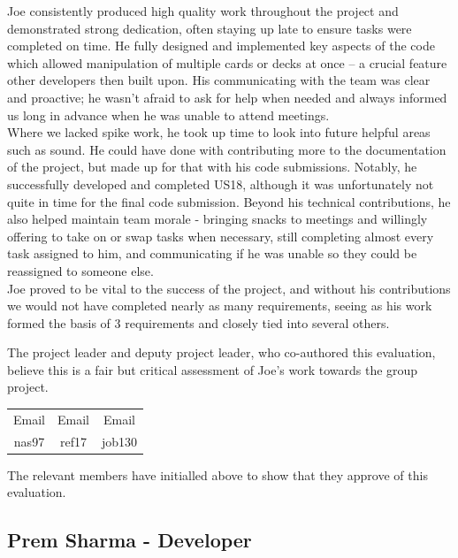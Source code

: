 \documentclass[a4paper]{project}
\begin{document}
			Joe consistently produced high quality work throughout the project and demonstrated strong dedication, often staying up late to ensure tasks were completed on time. He fully designed and implemented key aspects of the code which allowed manipulation of multiple cards or decks at once – a crucial feature other developers then built upon. His communicating with the team was clear and proactive; he wasn’t afraid to ask for help when needed and always informed us long in advance when he was unable to attend meetings. \\
			Where we lacked spike work, he took up time to look into future helpful areas such as sound. He could have done with contributing more to the documentation of the project, but made up for that with his code submissions. Notably, he successfully developed and completed US18, although it was unfortunately not quite in time for the final code submission. Beyond his technical contributions, he also helped maintain team morale - bringing snacks to meetings and willingly offering to take on or swap tasks when necessary, still completing almost every task assigned to him, and communicating if he was unable so they could be reassigned to someone else. \\
			Joe proved to be vital to the success of the project, and without his contributions we would not have completed nearly as many requirements, seeing as his work formed the basis of 3 requirements and closely tied into several others.
		
			The project leader and deputy project leader, who co-authored this evaluation, believe this is a fair but critical assessment of Joe's work towards the group project.
			
			\begin{center}
				\setlength{\tabcolsep}{0.05\paperwidth}
				\begin{tabular}{c c c}
					Email & Email & Email  \\
					nas97 & ref17 & job130
				\end{tabular}
			\end{center}
			
			The relevant members have initialled above to show that they approve of this evaluation.
		
		\subsection{Prem Sharma - Developer}\label{subsec:performance-prem-sharma}
		
\end{document}

